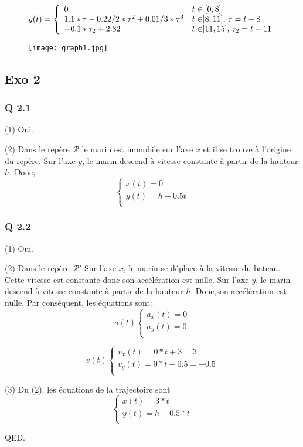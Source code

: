 \documentclass[]{book}
\theoremstyle{definition}
\begin{document}
$$ y(t) =
\left\{ 
\begin{array}{l l}
0 &  t \in [0,8] \\
1.1*\tau - 0.22/2*\tau^2 + 0.01/3*\tau^3 &  t \in ]8,11],\, \tau = t-8 \\
-0.1*\tau_2+2.32 &  t \in ]11,15],\, \tau_2 = t-11 \\
\end{array}
\right. 
$$

\begin{figure}[h!]
  \texttt{[image: graph1.jpg]}
\end{figure}



\subsection*{Exo 2}
\subsubsection*{Q 2.1}
(1) Oui.


(2) Dans le rep\`ere $\mathcal{R}$ le marin est immobile sur l'axe $x$ et il se trouve \`a l'origine du rep\`ere.
Sur l'axe $y$, le marin descend \`a vitesse constante \`a partir de la hauteur $h$. Donc, 
$$ 
\left\{ 
\begin{array}{l}
x(t) = 0 \\
y(t) = h -0.5t \\
\end{array}
\right. 
$$

\subsubsection*{Q 2.2}
(1) Oui.

(2) Dans le rep\`ere $\mathcal{R'}$ Sur l'axe $x$, le marin se d\'eplace \`a la vitesse du bateau. Cette vitesse est 
constante donc son acc\'el\'eration est nulle.
Sur l'axe $y$, le marin descend \`a vitesse constante \`a partir de la hauteur $h$. Donc,son acc\'el\'eration est nulle.  
Par cons\'equent, les \'equations sont:
$$ a(t)
\left\{ 
\begin{array}{l}
a_x(t) = 0 \\
a_y(t) = 0 \\
\end{array}
\right. 
$$

$$ v(t)
\left\{ 
\begin{array}{l}
v_x(t) = 0*t + 3 = 3 \\
v_y(t) = 0*t - 0.5 = -0.5 \\
\end{array}
\right. 
$$


(3) Du (2), les \'equations de la trajectoire sont
$$
\left\{ 
\begin{array}{l}
x(t) = 3*t \\
y(t) = h - 0.5*t \\
\end{array}
\right. 
$$

QED.
\end{document}
